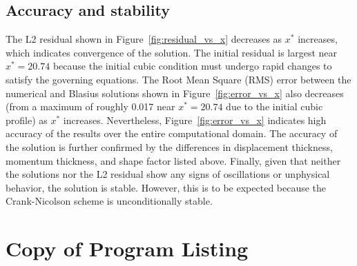 \documentclass[letterpaper,12pt]{article}
\begin{document}
\subsection{Accuracy and stability}

The L2 residual shown in Figure~\ref{fig:residual_vs_x} decreases as $x^*$ increases, which indicates convergence of the solution. The initial residual is largest near $x^* = 20.74$ because the initial cubic condition must undergo rapid changes to satisfy the governing equations. The Root Mean Square (RMS) error between the numerical and Blasius solutions shown in Figure~\ref{fig:error_vs_x} also decreases (from a maximum of roughly 0.017 near $x^* = 20.74$ due to the initial cubic profile) as $x^*$ increases. Nevertheless, Figure~\ref{fig:error_vs_x} indicates high accuracy of the results over the entire computational domain. The accuracy of the solution is further confirmed by the differences in displacement thickness, momentum thickness, and shape factor listed above. Finally, given that neither the solutions nor the L2 residual show any signs of oscillations or unphysical behavior, the solution is stable. However, this is to be expected because the Crank-Nicolson scheme is unconditionally stable.


\newpage
\appendix
\section{Copy of Program Listing}
\label{appendix-code}



\end{document}
